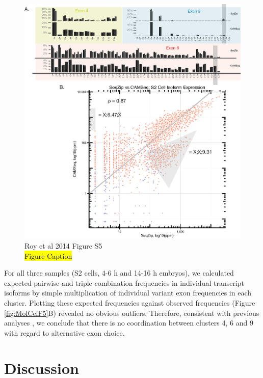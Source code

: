 {		\begin{figure}[htbp] %
			  \centering 
			  \includegraphics{Figures/SeqZipPaper/Roy2014FigS5.eps}
			  \caption[Roy et al 2014 Figure S5]
			  {Roy et al 2014 Figure S5 \\
			    \hl{Figure Caption}
			    }
			  \label{fig:Roy2014 FS5}
			  \end{figure}

		For all three samples (S2 cells, 4-6 h and 14-16 h embryos), we calculated expected pairwise and triple combination frequencies in individual transcript isoforms by simple multiplication of individual variant exon frequencies in each cluster. Plotting these expected frequencies against observed frequencies (Figure \ref{fig:MolCelF5}B) revealed no obvious outliers. Therefore, consistent with previous analyses \citep{Neves2004,Sun2013}, we conclude that there is no coordination between \dscam{} clusters 4, 6 and 9 with regard to alternative exon choice.
			
\section{Discussion}\label{c2sec: Discussion}

}
